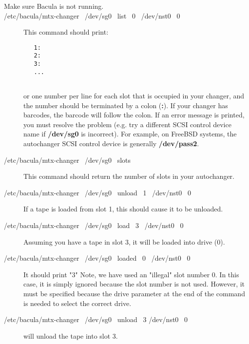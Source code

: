 \begin{description}

\item [Make sure Bacula is not running.]

\item [/etc/bacula/mtx-changer \ /dev/sg0 \ list \ 0 \ /dev/nst0 \ 0]

This command should print:  

\footnotesize
\begin{verbatim}
   1:
   2:
   3:
   ...
   
\end{verbatim}
\normalsize

or one number per line for each slot that is  occupied in your changer, and
the number should be  terminated by a colon ({\bf :}). If your changer has 
barcodes, the barcode will follow the colon.  If an error message is printed,
you must resolve the  problem (e.g. try a different SCSI control device name
if {\bf /dev/sg0}  is incorrect). For example, on FreeBSD systems, the
autochanger  SCSI control device is generally {\bf /dev/pass2}.  

\item [/etc/bacula/mtx-changer \ /dev/sg0 \ slots ]

This command should return the number of slots in your autochanger.  

\item [/etc/bacula/mtx-changer \ /dev/sg0 \ unload \ 1 \ /dev/nst0 \ 0 ]

   If a tape is loaded from slot 1, this should cause it to be unloaded.  

\item [/etc/bacula/mtx-changer \ /dev/sg0 \ load \ 3 \ /dev/nst0 \ 0 ]

Assuming you have a tape in slot 3,  it will be loaded into drive (0).
 

\item [/etc/bacula/mtx-changer \ /dev/sg0 \ loaded \ 0 \ /dev/nst0 \ 0]

It should print "3"  
Note, we have used an "illegal" slot number 0. In this case, it is simply
ignored because the slot number is not used.  However, it must be specified
because the drive parameter at the end of the command is needed to select
the correct drive.

\item [/etc/bacula/mtx-changer \ /dev/sg0 \ unload \ 3 /dev/nst0 \ 0]

will unload the tape into slot 3.

\end{description}

